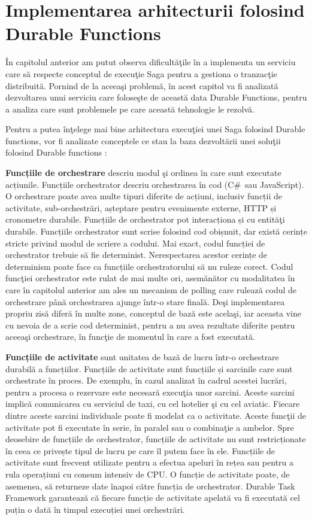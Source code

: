 \section{Implementarea arhitecturii folosind \\ Durable Functions}
\quad În capitolul anterior am putut observa dificultăţile în a implementa un serviciu care să respecte conceptul de execuţie Saga pentru a gestiona o tranzacţie distribuită. Pornind de la aceeaşi problemă, în acest capitol va fi analizată dezvoltarea unui serviciu care foloseşte de această data Durable Functions, pentru a analiza care sunt problemele pe care această tehnologie le rezolvă.
\par Pentru a putea înţelege mai bine arhitectura execuţiei unei Saga folosind Durable functions, vor fi analizate conceptele ce stau la baza dezvoltării unei soluţii folosind Durable functions :
\par \textbf{Funcțiile de orchestrare} descriu modul şi ordinea în care sunt executate acțiunile. Funcțiile orchestrator descriu orchestrarea în cod (C\#\ sau JavaScript). O orchestrare poate avea multe tipuri diferite de acțiuni, inclusiv funcții de activitate, sub-orchestrări, așteptare pentru evenimente externe, HTTP și cronometre durabile. Funcțiile de orchestrator pot interacționa și cu entităţi durabile. Funcțiile orchestrator sunt scrise folosind cod obișnuit, dar există cerințe stricte privind modul de scriere a codului. Mai exact, codul funcției de orchestrator trebuie să fie determinist. Nerespectarea acestor cerințe de determinism poate face ca funcțiile orchestratorului să nu ruleze corect. Codul funcţiei orchestrator este rulat de mai multe ori, asemănător cu modalitatea în care în capitolul anterior am ales un mecanism de polling care rulează codul de orchestrare până orchestrarea ajunge într-o stare finală. Deşi implementarea propriu zisă diferă în multe zone, conceptul de bază este acelaşi, iar aceasta vine cu nevoia de a scrie cod determinist, pentru a nu avea rezultate diferite pentru aceeaşi orchestrare, în funcţie de momentul în care a fost executată.
\par \textbf{Funcțiile de activitate}  sunt unitatea de bază de lucru într-o orchestrare durabilă a funcțiilor. Funcțiile de activitate sunt funcțiile și sarcinile care sunt orchestrate în proces. De exemplu, în cazul analizat în cadrul acestei lucrări, pentru a procesa o rezervare este necesară execuţia unor sarcini. Aceste sarcini implică comunicarea cu serviciul de taxi, cu cel hotelier şi cu cel aviatic. Fiecare dintre aceste sarcini individuale poate fi modelat ca o activitate. Aceste funcţii de activitate pot fi executate în serie, în paralel sau o combinaţie a ambelor. Spre deosebire de funcțiile de orchestrator, funcțiile de activitate nu sunt restricționate în ceea ce privește tipul de lucru pe care îl putem face în ele. Funcțiile de activitate sunt frecvent utilizate pentru a efectua apeluri în rețea sau pentru a rula operațiuni cu consum intensiv de CPU. O funcție de activitate poate, de asemenea, să returneze date înapoi către funcția de orchestrator. Durable Task Framework garantează că fiecare funcție de activitate apelată va fi executată cel puțin o dată în timpul execuției unei orchestrări.
